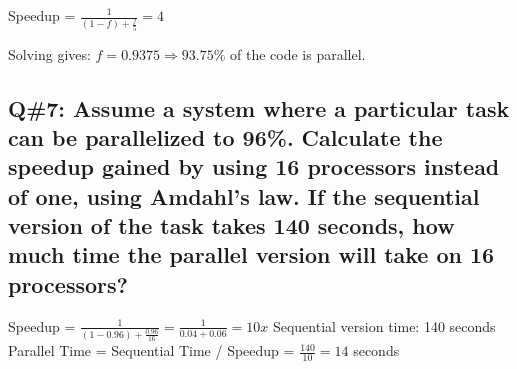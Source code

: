 Speedup = \( \frac{1}{(1 - f) + \frac{f}{5}} = 4 \)

Solving gives: \( f = 0.9375 \Rightarrow 93.75\% \) of the code is parallel.

\subsection*{Q\#7: Assume a system where a particular task can be parallelized to 96\%. Calculate the speedup
gained by using 16 processors instead of one, using Amdahl’s law. If the sequential version of the task
takes 140 seconds, how much time the parallel version will take on 16 processors?}

Speedup = \( \frac{1}{(1 - 0.96) + \frac{0.96}{16}} = \frac{1}{0.04 + 0.06} = 10x \)
Sequential version time: 140 seconds  \\
Parallel Time = Sequential Time / Speedup = \( \frac{140}{10} = 14 \) seconds

